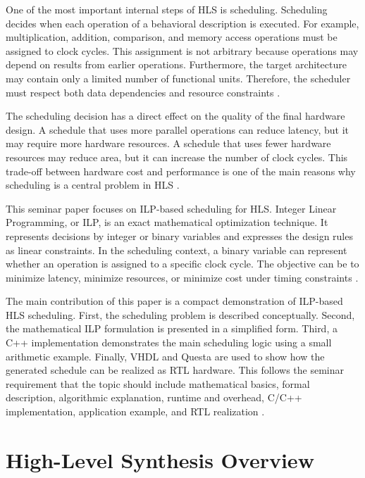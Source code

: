 \documentclass[conference]{IEEEtran}
\begin{document}
	One of the most important internal steps of HLS is scheduling. Scheduling decides when each operation of a behavioral description is executed. For example, multiplication, addition, comparison, and memory access operations must be assigned to clock cycles. This assignment is not arbitrary because operations may depend on results from earlier operations. Furthermore, the target architecture may contain only a limited number of functional units. Therefore, the scheduler must respect both data dependencies and resource constraints \cite{teich,demicheli}.
	
	The scheduling decision has a direct effect on the quality of the final hardware design. A schedule that uses more parallel operations can reduce latency, but it may require more hardware resources. A schedule that uses fewer hardware resources may reduce area, but it can increase the number of clock cycles. This trade-off between hardware cost and performance is one of the main reasons why scheduling is a central problem in HLS \cite{teich,demicheli,mcfarland}.
	
	This seminar paper focuses on ILP-based scheduling for HLS. Integer Linear Programming, or ILP, is an exact mathematical optimization technique. It represents decisions by integer or binary variables and expresses the design rules as linear constraints. In the scheduling context, a binary variable can represent whether an operation is assigned to a specific clock cycle. The objective can be to minimize latency, minimize resources, or minimize cost under timing constraints \cite{teich,demicheli}.
	
	The main contribution of this paper is a compact demonstration of ILP-based HLS scheduling. First, the scheduling problem is described conceptually. Second, the mathematical ILP formulation is presented in a simplified form. Third, a C++ implementation demonstrates the main scheduling logic using a small arithmetic example. Finally, VHDL and Questa are used to show how the generated schedule can be realized as RTL hardware. This follows the seminar requirement that the topic should include mathematical basics, formal description, algorithmic explanation, runtime and overhead, C/C++ implementation, application example, and RTL realization \cite{rettberg}.
	
	\section{High-Level Synthesis Overview}
	
\end{document}
